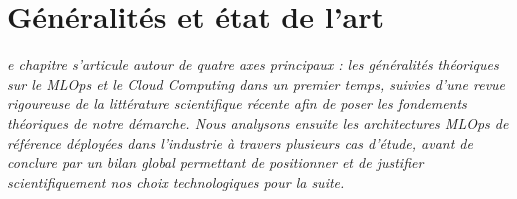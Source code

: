 \chapter{Généralités et état de l'art}
\label{chap:generalites_etat_art}

\textit{e chapitre s'articule autour de quatre axes principaux : les généralités théoriques sur le MLOps et le Cloud Computing dans un premier temps, suivies d'une revue rigoureuse de la littérature scientifique récente afin de poser les fondements théoriques de notre démarche. Nous analysons ensuite les architectures MLOps de référence déployées dans l'industrie à travers plusieurs cas d'étude, avant de conclure par un bilan global permettant de positionner et de justifier scientifiquement nos choix technologiques pour la suite.}

\renewcommand{\mtctitle}{Sommaire}
\minitoc
\newpage







